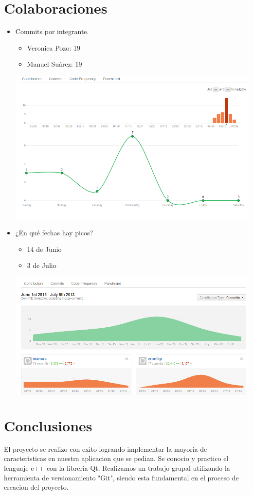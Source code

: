 \documentclass[12pt,oneside]{book}
\begin{document}
\chapter{Colaboraciones}

\begin {itemize}	

\item Commits por integrante.
\begin{itemize}
\item Veronica Pozo: 19
\item Manuel Suárez: 19
\end{itemize}

\includegraphics[width=1.10\textwidth]{./imagenes/Contribuidores_linea.png}

\item ¿En qué fechas hay picos?
\begin{itemize}
\item 14 de Junio
\item 3 de Julio
\end{itemize}
	\includegraphics[width=1.10\textwidth]{./imagenes/Contribuidores_commit.png}
\end{itemize}
\chapter{Conclusiones}
El proyecto se realizo con exito logrando implementar la mayoria de caracteristicas en nuestra aplicacion que se pedian. 
Se conocio y practico el lenguaje c++ con la libreria Qt.
Realizamos un trabajo grupal utilizando la herramienta de versionamiento "Git", siendo esta fundamental en el proceso de creacion
del proyecto. 
\end{document}
